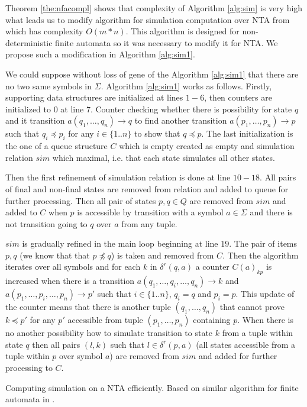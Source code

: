 \documentclass[a4paper, 12pt]{article}
\begin{document}
Theorem \ref{the:nfacompl} shows that complexity of Algorithm \ref{alg:sim} is very high what leads us
to modify algorithm for simulation computation over NTA from \cite{ilie:nfa} which has complexity $O(m*n)$.
This algorithm is designed for non-deterministic finite automata so it was necessary to modify it for NTA.
We propose such a modification in Algorithm \ref{alg:sim1}.

We could suppose without loss of gene of the Algorithm \ref{alg:sim1} that there are no two same symbols in $\Sigma$.
Algorithm \ref{alg:sim1} works as follows.
Firstly, supporting data structures are initialized at lines $1-6$, then counters are initialized to $0$ at line $7$.
Counter checking whether there is possibility for state $q$ and it transition $a(q_1, \ldots, q_n) \rightarrow q$ 
to find another transition $a(p_1, \ldots, p_n) \rightarrow p$ such that $q_i \preceq p_i$ for any $i \in \{1..n\}$ to show that $q \preceq p$.
The last initialization is the one of a queue structure $C$ which is empty created as empty and simulation relation $sim$ which maximal, i.e. that each
state simulates all other states.

Then the first refinement of simulation relation is done at line $10-18$.
All pairs of final and non-final states are removed from relation and added to queue for further processing.
Then all pair of states $p,q \in Q$ are removed from $sim$ and added to $C$ when $p$ is accessible by transition with a symbol $a \in \Sigma$
and there is not transition going to $q$ over $a$ from any tuple.

$sim$ is gradually refined in the main loop beginning at line $19$.
The pair of items $p,q$ (we know that that $p \not\preceq q$) is taken and removed from $C$.
Then the algorithm iterates over all symbols and for each $k$ in $\delta^r(q,a)$ a counter $C(a)_{kp}$
is increased when there is a transition $a(q_1, \ldots, q_i, \ldots, q_n) \rightarrow k$ and $a(p_1, \ldots, p_i, \ldots, p_n) \rightarrow p'$
such that $i\in \{1..n\}$, $q_i = q$ and $p_i = p$.
This update of the counter means that there is another tuple $(q_1, \ldots,q_n)$ that cannot prove $k \preceq p'$
for any $p'$ accessible from tuple $(p_1, \ldots, p_n)$ containing $p$.
When there is no another possibility how to simulate transition to state $k$ from a tuple within state $q$
then all pairs $(l,k)$ such that $l \in \delta^r(p,a)$ (all states accessible from a tuple within $p$ over symbol $a$) are
removed from $sim$ and added for further processing to $C$.


\begin{algorithm}[H]
	
	 \caption{Computing simulation on a NTA efficiently. Based on similar algorithm for finite automata in \cite{ilie:nfa}.}
\label{alg:sim1}
\end{algorithm}
\end{document}
